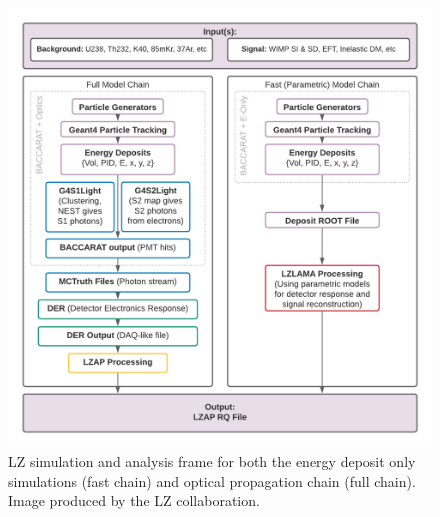 \begin{figure}
    \centering
    \includegraphics[width=15cm]{Figures/LZ/FullAndFastChains.png}
    \caption{LZ simulation and analysis frame for both the energy deposit only simulations (fast chain) and optical propagation chain (full chain).
             Image produced by the LZ collaboration.}
    \label{fig:lz_simulation_chain}
\end{figure}







